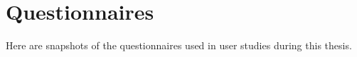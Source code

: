 \chapter{Questionnaires} %
\label{AppendixA} %

Here are snapshots of the questionnaires used in user studies during this thesis.





